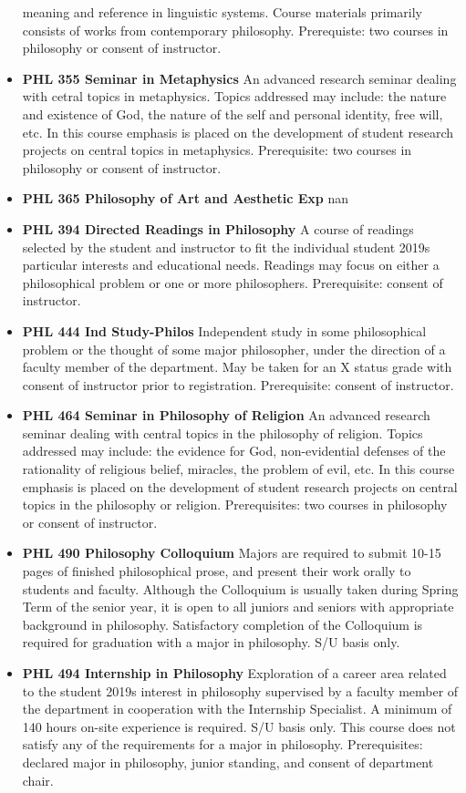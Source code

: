 \documentclass[
  letterpaper,
]{scrbook}
\begin{document}
\begin{itemize}
  meaning and reference in linguistic systems. Course materials
  primarily consists of works from contemporary philosophy. Prerequiste:
  two courses in philosophy or consent of instructor.
\item
  \textbf{PHL 355 Seminar in Metaphysics} An advanced research seminar
  dealing with cetral topics in metaphysics. Topics addressed may
  include: the nature and existence of God, the nature of the self and
  personal identity, free will, etc. In this course emphasis is placed
  on the development of student research projects on central topics in
  metaphysics. Prerequisite: two courses in philosophy or consent of
  instructor.
\item
  \textbf{PHL 365 Philosophy of Art and Aesthetic Exp} nan
\item
  \textbf{PHL 394 Directed Readings in Philosophy} A course of readings
  selected by the student and instructor to fit the individual student
  2019s particular interests and educational needs. Readings may focus
  on either a philosophical problem or one or more philosophers.
  Prerequisite: consent of instructor.
\item
  \textbf{PHL 444 Ind Study-Philos} Independent study in some
  philosophical problem or the thought of some major philosopher, under
  the direction of a faculty member of the department. May be taken for
  an X status grade with consent of instructor prior to registration.
  Prerequisite: consent of instructor.
\item
  \textbf{PHL 464 Seminar in Philosophy of Religion} An advanced
  research seminar dealing with central topics in the philosophy of
  religion. Topics addressed may include: the evidence for God,
  non-evidential defenses of the rationality of religious belief,
  miracles, the problem of evil, etc. In this course emphasis is placed
  on the development of student research projects on central topics in
  the philosophy or religion. Prerequisites: two courses in philosophy
  or consent of instructor.
\item
  \textbf{PHL 490 Philosophy Colloquium} Majors are required to submit
  10-15 pages of finished philosophical prose, and present their work
  orally to students and faculty. Although the Colloquium is usually
  taken during Spring Term of the senior year, it is open to all juniors
  and seniors with appropriate background in philosophy. Satisfactory
  completion of the Colloquium is required for graduation with a major
  in philosophy. S/U basis only.
\item
  \textbf{PHL 494 Internship in Philosophy} Exploration of a career area
  related to the student 2019s interest in philosophy supervised by a
  faculty member of the department in cooperation with the Internship
  Specialist. A minimum of 140 hours on-site experience is required. S/U
  basis only. This course does not satisfy any of the requirements for a
  major in philosophy. Prerequisites: declared major in philosophy,
  junior standing, and consent of department chair.
\end{itemize}
\end{document}
